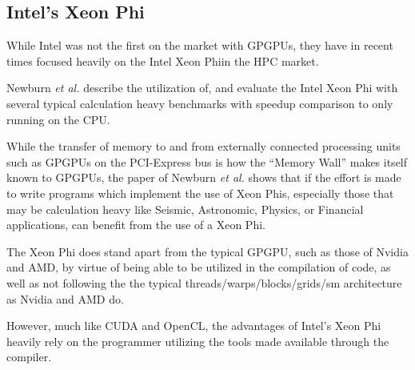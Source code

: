 \subsection{Intel's Xeon Phi}

While Intel was not the first on the market with GPGPUs, they have in recent times focused heavily on the Intel Xeon Phi\texttrademark in the HPC market.

Newburn \textit{et al.}\cite{Newburn:2013:OCR:2510648.2511038} describe the utilization of, and evaluate the Intel Xeon Phi with several typical calculation heavy benchmarks with speedup comparison to only running on the CPU.

While the transfer of memory to and from externally connected processing units such as GPGPUs on the PCI-Express bus is how the ``Memory Wall'' makes itself known to GPGPUs,
the paper of Newburn \textit{et al.} shows that if the effort is made to write programs which implement the use of Xeon Phis, especially those that may be calculation heavy like Seismic, Astronomic, Physics, or Financial applications, can benefit from the use of a Xeon Phi.

The Xeon Phi does stand apart from the typical GPGPU, such as those of Nvidia and AMD, by virtue of being able to be utilized in the compilation of code, as well as not following the the typical threads/warps/blocks/grids/sm architecture as Nvidia and AMD do.

However, much like CUDA and OpenCL, the advantages of Intel's Xeon Phi heavily rely on the programmer utilizing the tools made available through the compiler.
